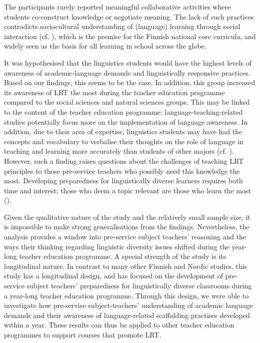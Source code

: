 \documentclass[output=paper]{langscibook}
\begin{document}
The participants rarely reported meaningful collaborative activities where students co-construct knowledge or negotiate meaning. The lack of such practices contradicts sociocultural understanding of (language) learning through social interaction (cf. \citealt{Donato2000,Dufva2020,LantolfThorne2006,Vygotsky1978}), which is the premise for the Finnish national core curricula, and widely seen as the basis for all learning in school across the globe.

It was hypothesised that the linguistics students would have the highest levels of awareness of academic-language demands and linguistically responsive practices. Based on our findings, this seems to be the case. In addition, this group increased its awareness of LRT the most during the teacher education programme compared to the social sciences and natural sciences groups. This may be linked to the content of the teacher education programme: language-teaching-related studies potentially focus more on the implementation of language awareness. In addition, due to their area of expertise, linguistics students may have had the concepts and vocabulary to verbalise their thoughts on the role of language in teaching and learning more accurately than students of other majors (cf. \citealt{HeikkolaEtAl2021}). However, such a finding raises questions about the challenges of teaching LRT principles to those pre-service teachers who possibly need this knowledge the most. Developing preparedness for linguistically diverse learners requires both time and interest; those who deem a topic relevant are those who learn the most (\citealt{Repo2020}).

Given the qualitative nature of the study and the relatively small sample size, it is impossible to make strong generalisations from the findings. Nevertheless, the analysis provides a window into pre-service subject teachers’ reasoning and the ways their thinking regarding linguistic diversity issues shifted during the year-long teacher education programme. A special strength of the study is its longitudinal nature. In contrast to many other Finnish and Nordic studies, this study has a longitudinal design, and has focused on the development of pre-service subject teachers’ preparedness for linguistically diverse classrooms during a year-long teacher education programme. Through this design, we were able to investigate how pre-service subject-teachers’ understanding of academic language demands and their awareness of language-related scaffolding practises developed within a year. These results can thus be applied to other teacher education programmes to support courses that promote LRT. 
\end{document}
